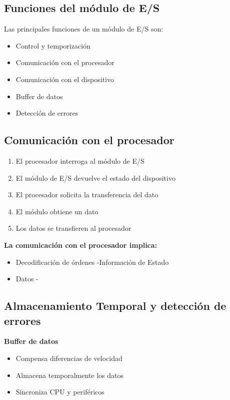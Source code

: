 \documentclass[11pt]{article}
\begin{document}
\subsection*{Funciones del módulo de E/S}
\label{sec:orgd0c7d5c}

Las principales funciones de un módulo de E/S son:

\begin{itemize}
\item Control y temporización
\item Comunicación con el procesador
\item Comunicación con el dispositivo
\item Buffer de datos
\item Detección de errores
\end{itemize}
\subsection*{Comunicación con el procesador}
\label{sec:org0fbcf51}

\begin{enumerate}
\item El procesador interroga al módulo de E/S
\item El módulo de E/S devuelve el estado del dispositivo
\item El procesador solicita la transferencia del dato
\item El módulo obtiene un dato
\item Los datos se transfieren al procesador
\end{enumerate}

\textbf{La comunicación con el procesador implica:}
\begin{itemize}
\item Decodificación de órdenes  -Información de Estado
\item Datos                      -
\end{itemize}
\subsection*{Almacenamiento Temporal y detección de errores}
\label{sec:org502c80a}

\textbf{Buffer de datos}

\begin{itemize}
\item Compensa diferencias de velocidad
\item Almacena temporalmente los datos
\item Sincroniza CPU y periféricos
\end{itemize}
\end{document}
